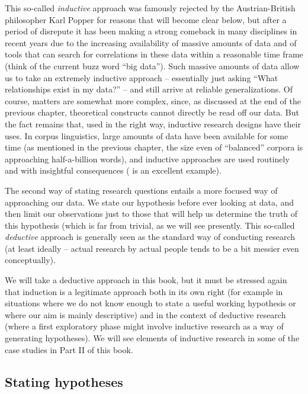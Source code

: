 This so-called \emph{inductive} approach was famously rejected by the Austrian\hyp{}British philosopher Karl Popper for reasons that will become clear below, but after a period of disrepute it has been making a strong comeback in many disciplines in recent years due to the increasing availability of massive amounts of data and of tools that can search for correlations in these data within a reasonable time frame (think of the current buzz word ``big data''). Such massive amounts of data allow us to take an extremely inductive approach -- essentially just asking ``What relationships exist in my data?'' -- and still arrive at reliable generalizations. Of course, matters are somewhat more complex, since, as discussed at the end of the previous chapter, theoretical constructs cannot directly be read off our data. But the fact remains that, used in the right way, inductive research designs have their uses. In corpus linguistics, large amounts of data have been available for some time (as mentioned in the previous chapter, the size even of ``balanced'' corpora is approaching half-a-billion words), and inductive approaches are used routinely and with insightful consequences (\citet{sinclair_corpus_1991} is an excellent example).

The second way of stating research questions entails a more focused way of approaching our data. We state our hypothesis before ever looking at data, and then limit our observations just to those that will help us determine the truth of this hypothesis (which is far from trivial, as we will see presently. This so-called \emph{deductive} approach is generally seen as the standard way of conducting research (at least ideally -- actual research by actual people tends to be a bit messier even conceptually).

We will take a deductive approach in this book, but it must be stressed again that induction is a legitimate approach both in its own right (for example in situations where we do not know enough to state a useful working hypothesis or where our aim is mainly descriptive) and in the context of deductive research (where a first exploratory phase might involve inductive research as a way of generating hypotheses). We will see elements of inductive research in some of the case studies in Part II of this book.

\subsection{Stating hypotheses}
\label{sec:statinghypotheses}

